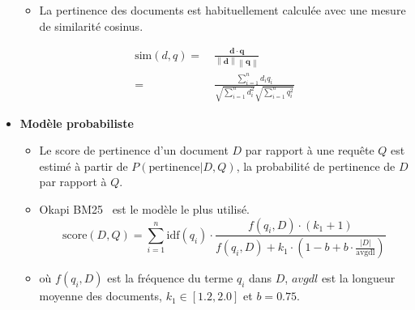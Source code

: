 \documentclass[12pt,aspectratio=43,dvipsnames,table]{beamer}
\begin{document}
\begin{frame}[allowframebreaks]
\begin{itemize}
\begin{itemize}
            \framebreak

            \item La pertinence des documents est habituellement calculée avec 
                  une mesure de similarité cosinus.
        \end{itemize}
        \begin{align*}
          \text{sim}(d,q) = &~\frac{ \mathbf{d} \cdot \mathbf{q} }
                                   { \left\|\mathbf{d}\right\| 
                                     \left\|\mathbf{q}\right\| } \\[0.5em]
                          = &~\frac{ \sum _{i=1}^n d_i q_i }
                                   { \sqrt{\sum_{i=1}^n d_i^2}
                                     \sqrt{\sum _{i=1}^n q_i^2} }
        \end{align*}

        \framebreak

        \item \textbf{Modèle probabiliste}~\cite{robertson1976relevance}
         \begin{itemize}
            \item Le score de pertinence d'un document $D$ par rapport à une 
                  requête $Q$ est estimé à partir de $P(\text{pertinence}|D,Q)$,
                  la probabilité de pertinence de $D$ par rapport à $Q$.
            \item Okapi BM25~\cite{DBLP:conf/trec/RobertsonWHGL92} est le modèle 
                  le plus utilisé.
            \begin{equation*}
              \text{score}(D,Q) = \sum_{i=1}^{n} \text{idf}(q_i) \cdot 
              \frac{f(q_i, D) \cdot (k_1 + 1)}
              {f(q_i, D) + k_1 \cdot (1 - b + b \cdot \frac{|D|}{\text{avgdl}})}
            \end{equation*}
            \item où $f(q_i, D)$ est la fréquence du terme $q_i$ dans $D$, 
                  $avgdl$ est la longueur moyenne des documents, 
                  $k_1 \in [1.2,2.0]$ et $b = 0.75$.
        \end{itemize}

        \framebreak


\end{itemize}
\end{frame}
\end{document}
